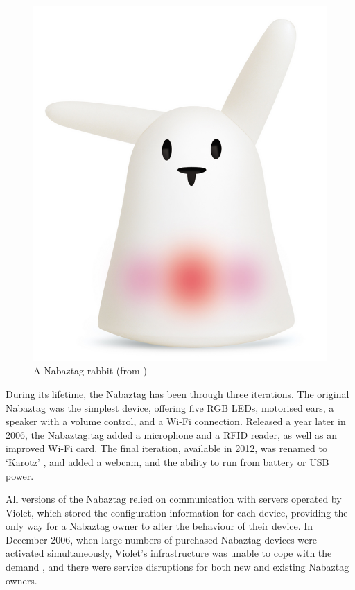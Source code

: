 \documentclass[12pt, a4paper]{article}
\begin{document}
		\begin{figure}[H]
			\centerline{
				\includegraphics[scale=0.7]{images/nabaztag.jpg}
			}
			\caption[A Nabaztag rabbit]{A Nabaztag rabbit (from \protect\parencite{nabazwiki})}
			\label{fig:nabaztag}
		\end{figure}
					
		During its lifetime, the Nabaztag has been through three iterations. The original Nabaztag was the simplest device, offering five \ac{RGB} \acp{LED}, motorised ears, a speaker with a volume control, and a Wi-Fi connection. Released a year later in 2006, the Nabaztag:tag \parencite{nabaztagtagpressrelease} added a microphone and a \ac{RFID} reader, as well as an improved Wi-Fi card. The final iteration, available in 2012, was renamed to `Karotz' \parencite{karotz}, and added a webcam, and the ability to run from battery or \ac{USB} power.
				
		All versions of the Nabaztag relied on communication with servers operated by Violet, which stored the configuration information for each device, providing the only way for a Nabaztag owner to alter the behaviour of their device. In December 2006, when large numbers of purchased Nabaztag devices were activated simultaneously, Violet's infrastructure was unable to cope with the demand \parencite{nabaztagblog}, and there were service disruptions for both new and existing Nabaztag owners.
		
\end{document}
